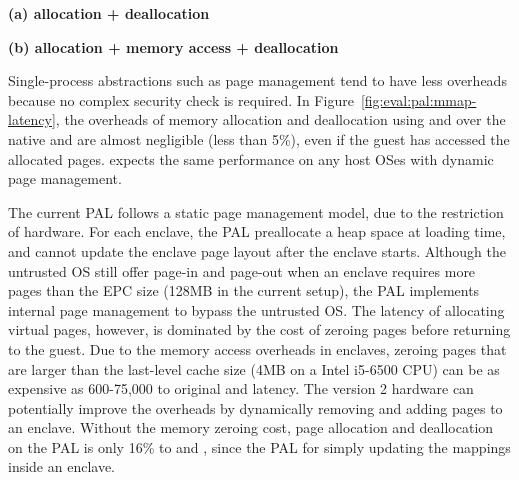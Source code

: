 \label{sec:eval:pal:memory}

\begin{figure*}[t!]
\centering
\footnotesize
{}
\parbox{0.49\textwidth}{\centering\bf (a) allocation + deallocation}
\parbox{0.49\textwidth}{\centering\bf (b) allocation + memory access + deallocation}
\caption{Latency of (a) allocating and deallocating a range of virtual pages, and (b) the same operations with writing to each page after allocation. Lower is better.
The comparison is between (1)  and  on Linux; (2)  and  on the Linux PAL, with and without a \seccomp{} filter ({\bf +SC}) and reference monitor ({\bf +RM}); (3) the same \hostapis{} on the \sgx{} PAL, with and without zeroing the pages before use ({\bf +Zero}).}
\label{fig:eval:pal:mmap-latency}
\end{figure*}

Single-process abstractions such as page management
tend to have less overheads
because no complex security check
is required.
In Figure~\ref{fig:eval:pal:mmap-latency},
the overheads of memory allocation and deallocation using  and 
over the native  and 
are almost negligible (less than 5\%),
even if the guest has accessed the allocated pages.
\graphene{} expects the same performance on any host OSes with dynamic page management.



The current \sgx{} PAL follows a static page management model,
due to the restriction of \sgx{} hardware.
For each enclave,
the \sgx{} PAL preallocate a heap space
at loading time,
and cannot update the enclave page layout
after the enclave starts. 
Although the untrusted OS still offer page-in and page-out
when an enclave requires more pages
than the EPC size (128MB in the current setup),
the \sgx{} PAL implements
internal page management to bypass the untrusted OS.
The latency
of allocating virtual pages, however,
is dominated by the cost of zeroing pages before returning to the guest.
Due to the memory access overheads in enclaves,
zeroing pages that are larger than the last-level cache size (4MB on a Intel i5-6500 CPU)
can be as expensive as 600-75,000\x{} to original  and  latency.
The \sgx{} version 2 hardware
can potentially improve the overheads by dynamically removing and adding pages to an enclave.
Without the memory zeroing cost,
page allocation and deallocation on the \sgx{} PAL
is only \roughly{}16\% to  and ,
since the \sgx{} PAL
for simply updating the mappings
inside an enclave.

